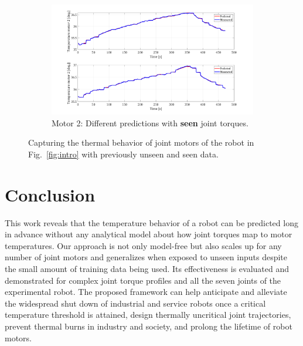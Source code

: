 \documentclass{ifacconf}
\begin{document}
\begin{figure}[t!]
\begin{subfigure}[t]{\columnwidth}
	\includegraphics[height=2.in]{./pictures/applications/J2.png}
	\caption{Motor 2: Different predictions with \textbf{seen} joint torques.}
\end{subfigure}
	\caption{Capturing the thermal behavior of joint motors of the robot in Fig.~\ref{fig:intro} with previously unseen and seen data.}
	\label{sevenjoint}
\end{figure}

\section{Conclusion}
This work reveals that the temperature behavior of a robot can be predicted long in advance without any analytical  model about how joint torques map to motor temperatures. Our approach is not only model-free but also scales up for any number of joint motors and generalizes when exposed to  unseen inputs despite the small amount of training data being used. Its effectiveness is evaluated and demonstrated for complex joint torque profiles and all the seven joints of the experimental robot. The proposed framework can help anticipate and alleviate the widespread shut down  of industrial and service robots once a critical temperature threshold is attained, design thermally uncritical joint trajectories, prevent thermal burns in industry and society, and prolong the lifetime of robot motors.


                                                   

\end{document}
